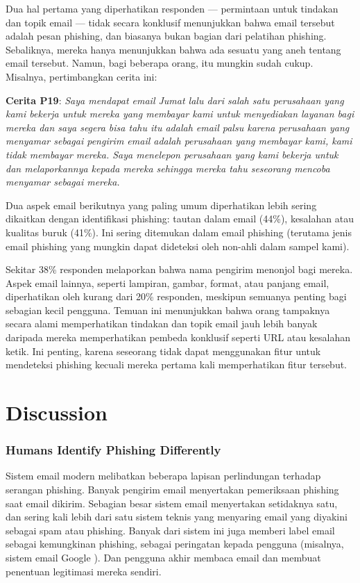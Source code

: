 \documentclass[lettersize,journal]{IEEEtran}
\begin{document}
Dua hal pertama yang diperhatikan responden — permintaan untuk tindakan dan
topik email — tidak secara konklusif menunjukkan bahwa email tersebut adalah
pesan phishing, dan biasanya bukan bagian dari pelatihan phishing. Sebaliknya,
mereka hanya menunjukkan bahwa ada sesuatu yang aneh tentang email tersebut.
Namun, bagi beberapa orang, itu mungkin sudah cukup. Misalnya, pertimbangkan
cerita ini:

\textbf{Cerita P19}: \textit{Saya mendapat email Jumat lalu dari salah satu perusahaan yang kami bekerja untuk mereka yang membayar kami untuk menyediakan layanan bagi mereka dan saya segera bisa tahu itu adalah email palsu karena perusahaan yang menyamar sebagai pengirim email adalah perusahaan yang membayar kami, kami tidak membayar mereka. Saya menelepon perusahaan yang kami bekerja untuk dan melaporkannya kepada mereka sehingga mereka tahu seseorang mencoba menyamar sebagai mereka.}

Dua aspek email berikutnya yang paling umum diperhatikan lebih sering dikaitkan
dengan identifikasi phishing: tautan dalam email (44\%), kesalahan atau
kualitas buruk (41\%). Ini sering ditemukan dalam email phishing (terutama
jenis email phishing yang mungkin dapat dideteksi oleh non-ahli dalam sampel
kami).

Sekitar 38\% responden melaporkan bahwa nama pengirim menonjol bagi mereka.
Aspek email lainnya, seperti lampiran, gambar, format, atau panjang email,
diperhatikan oleh kurang dari 20\% responden, meskipun semuanya penting bagi
sebagian kecil pengguna. Temuan ini menunjukkan bahwa orang tampaknya secara
alami memperhatikan tindakan dan topik email jauh lebih banyak daripada mereka
memperhatikan pembeda konklusif seperti URL atau kesalahan ketik. Ini penting,
karena seseorang tidak dapat menggunakan fitur untuk mendeteksi phishing
kecuali mereka pertama kali memperhatikan fitur tersebut.

\section{Discussion}

\subsubsection{Humans Identify Phishing Differently}
Sistem email modern melibatkan beberapa lapisan perlindungan terhadap serangan
phishing. Banyak pengirim email menyertakan pemeriksaan phishing saat email
dikirim. Sebagian besar sistem email menyertakan setidaknya satu, dan sering
kali lebih dari satu sistem teknis yang menyaring email yang diyakini sebagai
spam atau phishing. Banyak dari sistem ini juga memberi label email sebagai
kemungkinan phishing, sebagai peringatan kepada pengguna (misalnya, sistem
email Google \cite{dualima}). Dan pengguna akhir membaca email dan membuat
penentuan legitimasi mereka sendiri.
\end{document}

